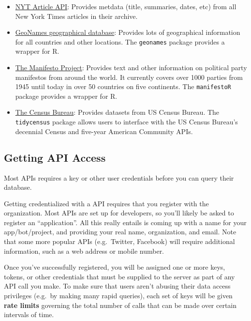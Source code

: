 \documentclass[]{book}
\providecommand{\tightlist}{%
  \setlength{\itemsep}{0pt}\setlength{\parskip}{0pt}}
\begin{document}
\begin{itemize}
\tightlist
\item
  \href{http://developer.nytimes.com/}{NYT Article API}: Provides metdata (title, summaries, dates, etc) from all New York Times articles in their archive.
\item
  \href{https://www.geonames.org/}{GeoNames geographical database}: Provides lots of geographical information for all countries and other locations. The \texttt{geonames} package provides a wrapper for R.
\item
  \href{https://manifesto-project.wzb.eu/.}{The Manifesto Project}: Provides text and other information on political party manifestos from around the world. It currently covers over 1000 parties from 1945 until today in over 50 countries on five continents. The \texttt{manifestoR} package provides a wrapper for R.
\item
  \href{https://www.census.gov/developers/}{The Census Bureau}: Provides datasets from US Census Bureau. The \texttt{tidycensus} package allows users to interface with the US Census Bureau's decennial Census and five-year American Community APIs.
\end{itemize}

\hypertarget{getting-api-access}{%
\subsection{Getting API Access}\label{getting-api-access}}

Most APIs requires a key or other user credentials before you can query their database.

Getting credentialized with a API requires that you register with the organization. Most APIs are set up for developers, so you'll likely be asked to register an ``application''. All this really entails is coming up with a name for your app/bot/project, and providing your real name, organization, and email. Note that some more popular APIs (e.g.~Twitter, Facebook) will require additional information, such as a web address or mobile number.

Once you've successfully registered, you will be assigned one or more keys, tokens, or other credentials that must be supplied to the server as part of any API call you make. To make sure that users aren't abusing their data access privileges (e.g.~by making many rapid queries), each set of keys will be given \textbf{rate limits} governing the total number of calls that can be made over certain intervals of time.
\end{document}

